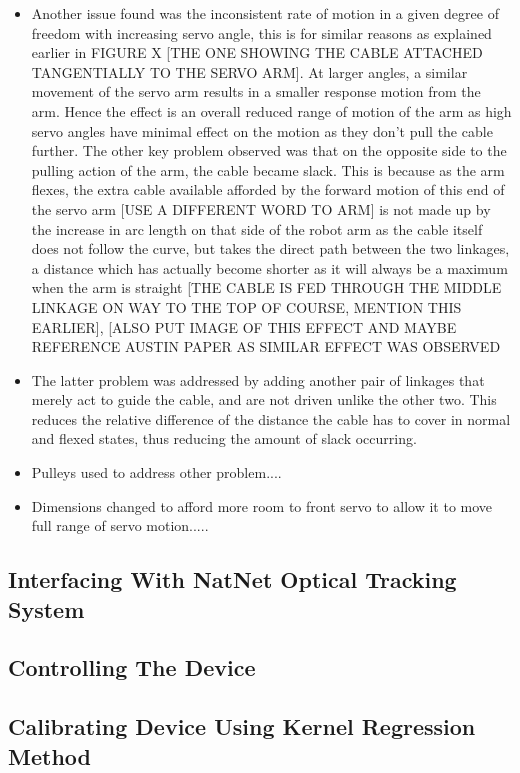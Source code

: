 \documentclass[11pt]{article}
\begin{document}
\begin{itemize}
\item{Another issue found was the inconsistent rate of motion in a given degree of freedom with increasing servo angle, this is for similar reasons as explained earlier in FIGURE X [THE ONE SHOWING THE CABLE ATTACHED TANGENTIALLY TO THE SERVO ARM]. At larger angles, a similar movement of the servo arm results in a smaller response motion from the arm. Hence the effect is an overall reduced range of motion of the arm as high servo angles have minimal effect on the motion as they don't pull the cable further. The other key problem observed was that on the opposite side to the pulling action of the arm, the cable became slack. This is because as the arm flexes, the extra cable available afforded by the forward motion of this end of the servo arm [USE A DIFFERENT WORD TO ARM] is not made up by the increase in arc length on that side of the robot arm  as the cable itself does not follow the curve, but takes the  direct path between the two linkages, a distance which has actually become shorter as it will always be a maximum when the arm is straight [THE CABLE IS FED THROUGH THE MIDDLE LINKAGE ON WAY TO THE TOP OF COURSE, MENTION THIS EARLIER], [ALSO PUT IMAGE OF THIS EFFECT AND MAYBE REFERENCE AUSTIN PAPER AS SIMILAR EFFECT WAS OBSERVED}
\item{The latter problem was addressed by adding another pair of linkages that merely act to guide the cable, and are not driven unlike the other two. This reduces the relative difference of the distance the cable has to cover in normal and flexed states, thus reducing the amount of slack occurring.}
\item{Pulleys used to address other problem....}
\item{Dimensions changed to afford more room to front servo to allow it to move full range of servo motion.....} 
\end{itemize}
\subsection{Interfacing With NatNet Optical Tracking System}
\subsection{Controlling The Device}
\subsection{Calibrating Device Using Kernel Regression Method}
\pagebreak 
\end{document}
